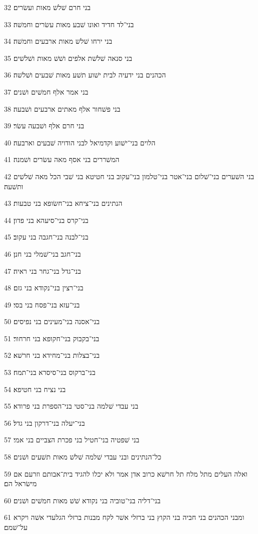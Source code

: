 \par 32 בני חרם שׁלשׁ מאות ועשׂרים׃
\par 33 בני־לד חדיד ואונו שׁבע מאות עשׂרים וחמשׁה׃
\par 34 בני ירחו שׁלשׁ מאות ארבעים וחמשׁה׃
\par 35 בני סנאה שׁלשׁת אלפים ושׁשׁ מאות ושׁלשׁים׃
\par 36 הכהנים בני ידעיה לבית ישׁוע תשׁע מאות שׁבעים ושׁלשׁה׃
\par 37 בני אמר אלף חמשׁים ושׁנים׃
\par 38 בני פשׁחור אלף מאתים ארבעים ושׁבעה׃
\par 39 בני חרם אלף ושׁבעה עשׂר׃
\par 40 הלוים בני־ישׁוע וקדמיאל לבני הודויה שׁבעים וארבעה׃
\par 41 המשׁררים בני אסף מאה עשׂרים ושׁמנה׃
\par 42 בני השׁערים בני־שׁלום בני־אטר בני־טלמון בני־עקוב בני חטיטא בני שׁבי הכל מאה שׁלשׁים ותשׁעה׃
\par 43 הנתינים בני־ציחא בני־חשׂופא בני טבעות׃
\par 44 בני־קרס בני־סיעהא בני פדון׃
\par 45 בני־לבנה בני־חגבה בני עקוב׃
\par 46 בני־חגב בני־שׁמלי בני חנן׃
\par 47 בני־גדל בני־גחר בני ראיה׃
\par 48 בני־רצין בני־נקודא בני גזם׃
\par 49 בני־עזא בני־פסח בני בסי׃
\par 50 בני־אסנה בני־מעינים בני נפיסים׃
\par 51 בני־בקבוק בני־חקופא בני חרחור׃
\par 52 בני־בצלות בני־מחידא בני חרשׁא׃
\par 53 בני־ברקוס בני־סיסרא בני־תמח׃
\par 54 בני נציח בני חטיפא׃
\par 55 בני עבדי שׁלמה בני־סטי בני־הספרת בני פרודא׃
\par 56 בני־יעלה בני־דרקון בני גדל׃
\par 57 בני שׁפטיה בני־חטיל בני פכרת הצביים בני אמי׃
\par 58 כל־הנתינים ובני עבדי שׁלמה שׁלשׁ מאות תשׁעים ושׁנים׃
\par 59 ואלה העלים מתל מלח תל חרשׁא כרוב אדן אמר ולא יכלו להגיד בית־אבותם וזרעם אם מישׂראל הם׃
\par 60 בני־דליה בני־טוביה בני נקודא שׁשׁ מאות חמשׁים ושׁנים׃
\par 61 ומבני הכהנים בני חביה בני הקוץ בני ברזלי אשׁר לקח מבנות ברזלי הגלעדי אשׁה ויקרא על־שׁמם׃
